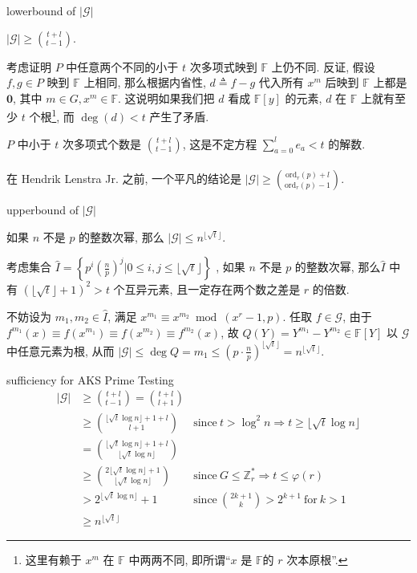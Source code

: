 \documentclass{beamer}
\def\le{\leqslant}
\def\ge{\geqslant}
\def\ord{\textrm{ord}}
\begin{document}
\begin{frame}{lowerbound of $|\mathcal G|$}
	\begin{lemma}
		$|\mathcal G| \ge \binom{t + l}{t - 1}$.
	\end{lemma}
	考虑证明 $P$ 中任意两个不同的小于 $t$ 次多项式映到 $\mathbb F$ 上仍不同. 反证, 假设 $f, g \in P$ 映到 $\mathbb F$ 上相同, 那么根据内省性, $d \triangleq f - g$ 代入所有 $x^m$ 后映到 $\mathbb F$ 上都是 $\mathbf{0}$, 其中 $m \in G, x^m \in \mathbb F$. 这说明如果我们把 $d$ 看成 $\mathbb F[y]$ 的元素, $d$ 在 $\mathbb F$ 上就有至少 $t$ 个根\footnote{\tiny 这里有赖于 $x^m$ 在 $\mathbb F$ 中两两不同, 即所谓“$x$ 是 $\mathbb F$的 $r$ 次本原根”.}, 而 $\deg (d) < t$ 产生了矛盾. 

	$P$ 中小于 $t$ 次多项式个数是 $\binom{t + l}{t - 1}$, 这是不定方程 $\sum\limits_{a=0}^{l}e_a < t$ 的解数.\\~\\

	{\kaishu 在 Hendrik Lenstra Jr. 之前, 一个平凡的结论是 $|\mathcal G| \ge \binom{\ord_r(p) + l}{\ord_r(p) - 1}$.}

\end{frame}
\begin{frame}{upperbound of $|\mathcal G|$}
	\begin{lemma}
		如果 $n$ 不是 $p$ 的整数次幂, 那么 $|\mathcal G| \le n^{\lfloor\sqrt{t}\rfloor}$.
	\end{lemma}
	考虑集合 $\hat{I} = \left\{p^i\left(\frac np\right)^j \bigg| 0 \le i, j \le \lfloor \sqrt {t}\rfloor \right\}$ , 如果 $n$ 不是 $p$ 的整数次幂, 那么$\hat{I}$ 中有 $(\lfloor\sqrt t\rfloor + 1)^2 > t$ 个互异元素, 且一定存在两个数之差是 $r$ 的倍数.
	
	不妨设为 $m_1, m_2 \in \hat{I}$, 满足 $x^{m_1} \equiv x^{m_2} \bmod (x^r-1, p)$. 任取 $f \in \mathcal G$, 由于 $f^{m_1}(x) \equiv f(x^{m_1}) \equiv f(x^{m_2}) \equiv f^{m_2}(x)$, 故 $Q(Y) = Y^{m_1} - Y^{m_2} \in \mathbb F[Y]$ 以 $\mathcal G$ 中任意元素为根, 从而 $|\mathcal G| \le \deg Q = m_1 \le (p \cdot \frac np)^{\lfloor \sqrt {t}\rfloor} = n^{\lfloor \sqrt {t}\rfloor}$.

\end{frame}
\begin{frame}{sufficiency for AKS Prime Testing}
	\begin{align*}
		|\mathcal G| &\ge \binom{t + l}{t - 1} = \binom{t + l}{l + 1} & \\
		&\ge \binom{\lfloor \sqrt{t}\log n\rfloor + 1 + l}{l + 1} & \textrm{since} \ t > \log^2n \Rightarrow t \ge \lfloor \sqrt{t}\log n\rfloor\\
		&= \binom{\lfloor \sqrt{t}\log n\rfloor + 1 + l}{\lfloor \sqrt{t}\log n\rfloor} & \\
		&\ge \binom{2\lfloor \sqrt{t}\log n\rfloor + 1 }{\lfloor \sqrt{t}\log n\rfloor} & \textrm{since} \ G \le \mathbb Z_r^* \Rightarrow t \le \varphi(r) \\
		&>2^{\lfloor \sqrt{t}\log n\rfloor}+1 & \textrm{since} \ \binom{2k+1}{k} > 2^{k+1} \ \textrm{for} \ k > 1\\
		&\ge n^{\lfloor \sqrt t \rfloor}&
	\end{align*}
\end{frame}
\end{document}
